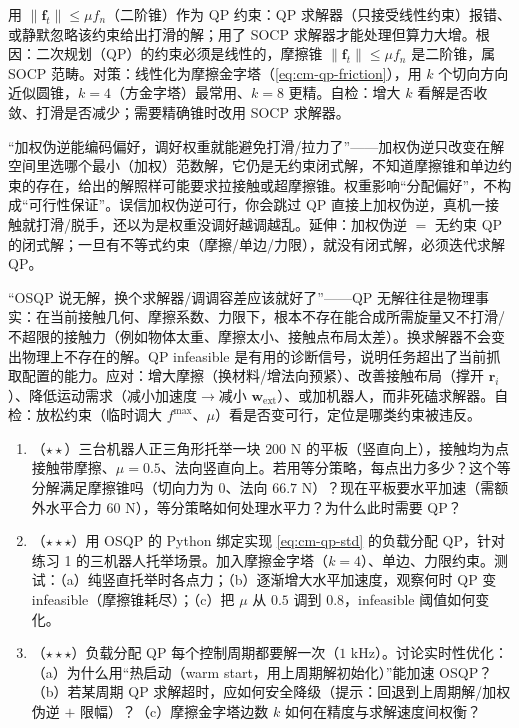\begin{pitfall}
用 $\|\mathbf{f}_t\|\le\mu f_n$（二阶锥）作为 QP 约束：QP 求解器（只接受线性约束）报错、或静默忽略该约束给出打滑的解；用了 SOCP 求解器才能处理但算力大增。根因：二次规划（QP）的约束必须是线性的，摩擦锥 $\|\mathbf{f}_t\|\le\mu f_n$ 是二阶锥，属 SOCP 范畴。对策：线性化为摩擦金字塔（\cref{eq:cm-qp-friction}），用 $k$ 个切向方向近似圆锥，$k=4$（方金字塔）最常用、$k=8$ 更精。自检：增大 $k$ 看解是否收敛、打滑是否减少；需要精确锥时改用 SOCP 求解器。
\end{pitfall}

\begin{pitfall}
“加权伪逆能编码偏好，调好权重就能避免打滑/拉力了”——加权伪逆只改变在解空间里选哪个最小（加权）范数解，它仍是无约束闭式解，不知道摩擦锥和单边约束的存在，给出的解照样可能要求拉接触或超摩擦锥。权重影响“分配偏好”，不构成“可行性保证”。误信加权伪逆可行，你会跳过 QP 直接上加权伪逆，真机一接触就打滑/脱手，还以为是权重没调好越调越乱。延伸：加权伪逆 $=$ 无约束 QP 的闭式解；一旦有不等式约束（摩擦/单边/力限），就没有闭式解，必须迭代求解 QP。
\end{pitfall}

\begin{pitfall}
“OSQP 说无解，换个求解器/调调容差应该就好了”——QP 无解往往是物理事实：在当前接触几何、摩擦系数、力限下，根本不存在能合成所需旋量又不打滑/不超限的接触力（例如物体太重、摩擦太小、接触点布局太差）。换求解器不会变出物理上不存在的解。QP infeasible 是有用的诊断信号，说明任务超出了当前抓取配置的能力。应对：增大摩擦（换材料/增法向预紧）、改善接触布局（撑开 $\mathbf{r}_i$）、降低运动需求（减小加速度$\to$减小 $\mathbf{w}_{\text{ext}}$）、或加机器人，而非死磕求解器。自检：放松约束（临时调大 $f^{\max}$、$\mu$）看是否变可行，定位是哪类约束被违反。
\end{pitfall}

\begin{practice}
\begin{enumerate}
  \item （$\star\star$）三台机器人正三角形托举一块 $200$ N 的平板（竖直向上），接触均为点接触带摩擦、$\mu=0.5$、法向竖直向上。若用等分策略，每点出力多少？这个等分解满足摩擦锥吗（切向力为 $0$、法向 $66.7$ N）？现在平板要水平加速（需额外水平合力 $60$ N），等分策略如何处理水平力？为什么此时需要 QP？
  \item （$\star\star\star$）用 OSQP 的 Python 绑定实现 \cref{eq:cm-qp-std} 的负载分配 QP，针对练习 1 的三机器人托举场景。加入摩擦金字塔（$k=4$）、单边、力限约束。测试：（a）纯竖直托举时各点力；（b）逐渐增大水平加速度，观察何时 QP 变 infeasible（摩擦锥耗尽）；（c）把 $\mu$ 从 $0.5$ 调到 $0.8$，infeasible 阈值如何变化。
  \item （$\star\star\star$）负载分配 QP 每个控制周期都要解一次（$1$ kHz）。讨论实时性优化：（a）为什么用“热启动（warm start，用上周期解初始化）”能加速 OSQP？（b）若某周期 QP 求解超时，应如何安全降级（提示：回退到上周期解/加权伪逆 $+$ 限幅）？（c）摩擦金字塔边数 $k$ 如何在精度与求解速度间权衡？
\end{enumerate}
\end{practice}

